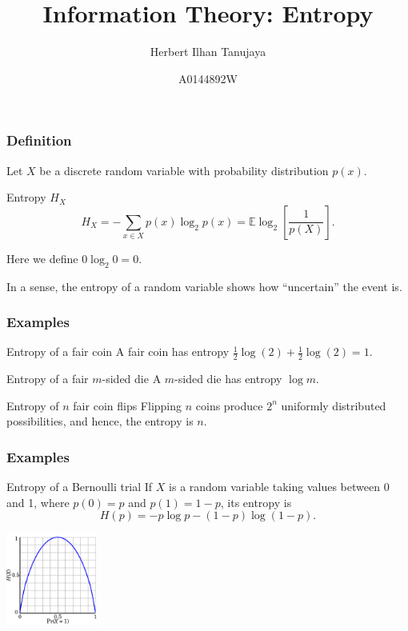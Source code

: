 \documentclass{beamer}
\title{Information Theory: Entropy}
\author{Herbert Ilhan Tanujaya}
\date{A0144892W}
\newcommand{\ls}{\left[}
\newcommand{\rs}{\right]}
\begin{document}
\begin{frame}
  \titlepage
\end{frame}

\begin{frame}
  \frametitle{Definition}
  Let $X$ be a discrete random variable with probability distribution $p(x)$.
  \begin{block}{Entropy $H_X$}
    \[ H_X = - \sum_{x \in X} p(x) \log_2 p(x) = \mathbb{E} \log_2 \ls \frac{1}{p(X)} \rs. \]
  \end{block}
  Here we define $0 \log_2 0 = 0$.

  In a sense, the entropy of a random variable shows how ``uncertain'' the event is.
\end{frame}

\begin{frame}
  \frametitle{Examples}
  \begin{exampleblock}{Entropy of a fair coin}
    A fair coin has entropy $\frac{1}{2} \log(2) + \frac{1}{2} \log(2) = 1$.
  \end{exampleblock}

  \begin{exampleblock}{Entropy of a fair $m$-sided die}
    A $m$-sided die has entropy $\log m$.
  \end{exampleblock}

  \begin{exampleblock}{Entropy of $n$ fair coin flips}
    Flipping $n$ coins produce $2^n$ uniformly distributed possibilities, and hence, the entropy is $n$.
  \end{exampleblock}
\end{frame}

\begin{frame}
  \frametitle{Examples}

  \begin{exampleblock}{Entropy of a Bernoulli trial}
    If $X$ is a random variable taking values between 0 and 1, where $p(0) = p$ and $p(1) = 1 - p$, its entropy is \[ H(p) = -p \log p - (1 - p) \log (1 - p). \]

    \begin{center}
      \includegraphics[width=3cm]{bernoulli.png}
    \end{center}
  \end{exampleblock}
\end{frame}
\end{document}
